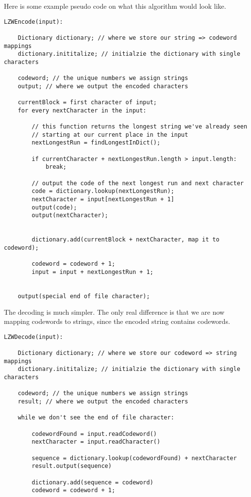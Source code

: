 \documentclass[12pt,twoside]{reedthesis}
\begin{document}
Here is some example pseudo code on what this algorithm would look like.
\begin{verbatim}
LZWEncode(input):

    Dictionary dictionary; // where we store our string => codeword mappings
    dictionary.inititalize; // initialzie the dictionary with single characters

    codeword; // the unique numbers we assign strings
    output; // where we output the encoded characters

    currentBlock = first character of input;
    for every nextCharacter in the input:
        
        // this function returns the longest string we've already seen
        // starting at our current place in the input
        nextLongestRun = findLongestInDict();

        if currentCharacter + nextLongestRun.length > input.length:
            break;
            
        // output the code of the next longest run and next character
        code = dictionary.lookup(nextLongestRun);
        nextCharacter = input[nextLongestRun + 1]
        output(code);
        output(nextCharacter);

        
        dictionary.add(currentBlock + nextCharacter, map it to codeword);

        codeword = codeword + 1;
        input = input + nextLongestRun + 1;


    output(special end of file character);
\end{verbatim}
The decoding is much simpler. The only real difference is that we are now mapping codewords to strings, since the encoded string contains codewords.
\begin{verbatim}
LZWDecode(input):

    Dictionary dictionary; // where we store our codeword => string mappings
    dictionary.inititalize; // initialzie the dictionary with single characters

    codeword; // the unique numbers we assign strings
    result; // where we output the encoded characters

    while we don't see the end of file character:

        codewordFound = input.readCodeword()
        nextCharacter = input.readCharacter()

        sequence = dictionary.lookup(codewordFound) + nextCharacter
        result.output(sequence)

        dictionary.add(sequence = codeword)
        codeword = codeword + 1;
\end{verbatim}
\end{document}
